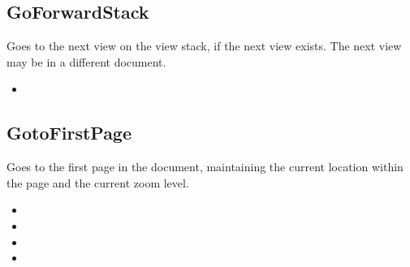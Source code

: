 \documentclass[letterpaper,12pt,english,openany,oneside]{sphinxmanual}
\begin{document}
\subsection{GoForwardStack}
\label{\detokenize{IAC_API_OLE_Objects:goforwardstack}}
Goes to the next view on the view stack, if the next view exists. The next view may be in a different document.


\begin{sphinxVerbatim}[commandchars=\\\{\}]
 
\end{sphinxVerbatim}
\label{\detokenize{IAC_API_OLE_Objects:related-methods-135}}
\begin{itemize}
\item {} 
 

\end{itemize}




\subsection{GotoFirstPage}
\label{\detokenize{IAC_API_OLE_Objects:gotofirstpage}}
Goes to the first page in the document, maintaining the current location within the page and the current zoom level.


\begin{sphinxVerbatim}[commandchars=\\\{\}]
 
\end{sphinxVerbatim}
\label{\detokenize{IAC_API_OLE_Objects:related-methods-136}}
\begin{itemize}
\item {} 
 

\item {} 
 

\item {} 
 

\item {} 
 

\end{itemize}
\end{document}
